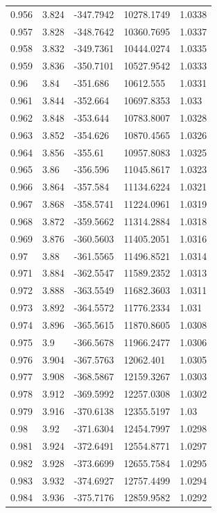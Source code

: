 \begin{tabular}{lllll}
0.956 & 3.824 & -347.7942 & 10278.1749 & 1.0338 \\
0.957 & 3.828 & -348.7642 & 10360.7695 & 1.0337 \\
0.958 & 3.832 & -349.7361 & 10444.0274 & 1.0335 \\
0.959 & 3.836 & -350.7101 & 10527.9542 & 1.0333 \\
0.96 & 3.84 & -351.686 & 10612.555 & 1.0331 \\
0.961 & 3.844 & -352.664 & 10697.8353 & 1.033 \\
0.962 & 3.848 & -353.644 & 10783.8007 & 1.0328 \\
0.963 & 3.852 & -354.626 & 10870.4565 & 1.0326 \\
0.964 & 3.856 & -355.61 & 10957.8083 & 1.0325 \\
0.965 & 3.86 & -356.596 & 11045.8617 & 1.0323 \\
0.966 & 3.864 & -357.584 & 11134.6224 & 1.0321 \\
0.967 & 3.868 & -358.5741 & 11224.0961 & 1.0319 \\
0.968 & 3.872 & -359.5662 & 11314.2884 & 1.0318 \\
0.969 & 3.876 & -360.5603 & 11405.2051 & 1.0316 \\
0.97 & 3.88 & -361.5565 & 11496.8521 & 1.0314 \\
0.971 & 3.884 & -362.5547 & 11589.2352 & 1.0313 \\
0.972 & 3.888 & -363.5549 & 11682.3603 & 1.0311 \\
0.973 & 3.892 & -364.5572 & 11776.2334 & 1.031 \\
0.974 & 3.896 & -365.5615 & 11870.8605 & 1.0308 \\
0.975 & 3.9 & -366.5678 & 11966.2477 & 1.0306 \\
0.976 & 3.904 & -367.5763 & 12062.401 & 1.0305 \\
0.977 & 3.908 & -368.5867 & 12159.3267 & 1.0303 \\
0.978 & 3.912 & -369.5992 & 12257.0308 & 1.0302 \\
0.979 & 3.916 & -370.6138 & 12355.5197 & 1.03 \\
0.98 & 3.92 & -371.6304 & 12454.7997 & 1.0298 \\
0.981 & 3.924 & -372.6491 & 12554.8771 & 1.0297 \\
0.982 & 3.928 & -373.6699 & 12655.7584 & 1.0295 \\
0.983 & 3.932 & -374.6927 & 12757.4499 & 1.0294 \\
0.984 & 3.936 & -375.7176 & 12859.9582 & 1.0292 \\

\end{tabular}

